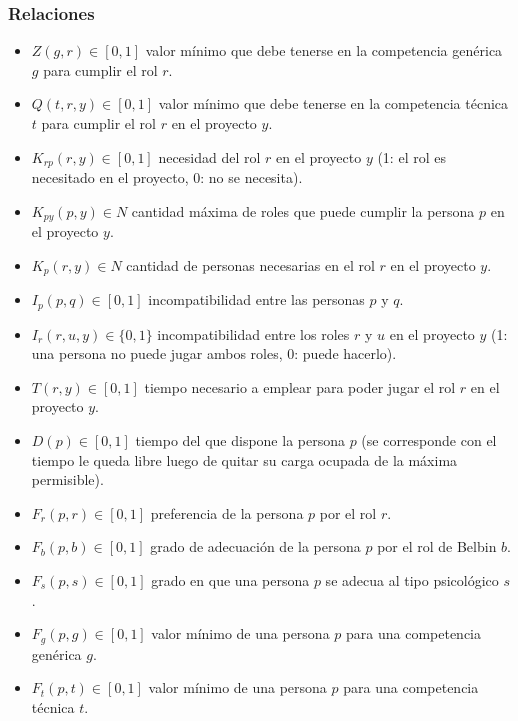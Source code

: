 \subsubsection{Relaciones} \label{relaciones}

\begin{itemize}
  \item $Z(g,r) \in [0,1]$ valor mínimo que debe tenerse en la competencia genérica $g$ para cumplir el rol $r$.
  
  \item $Q(t,r,y) \in [0,1]$ valor mínimo que debe tenerse en la competencia técnica $t$ para cumplir el rol $r$ en el proyecto $y$.
  
  \item $K_{rp}(r, y) \in [0,1]$ necesidad del rol $r$ en el proyecto $y$ (1: el rol es necesitado en el proyecto, 0: no se necesita).
  
  \item $K_{py}(p,y) \in N$ cantidad máxima de roles que puede cumplir la persona $p$ en el proyecto $y$.
  
  \item $K_{p}(r, y) \in N$ cantidad de personas necesarias en el rol $r$ en el proyecto $y$.
  \item $I_p(p,q) \in [0,1]$ incompatibilidad entre las personas $p$ y $q$.
  
  \item $I_r(r,u,y) \in \{0,1\}$ incompatibilidad entre los roles $r$ y $u$ en el proyecto $y$ (1: una persona no puede jugar ambos roles, 0: puede hacerlo).
  
  \item $T(r,y) \in [0,1]$ tiempo necesario a emplear para poder jugar el rol $r$ en el proyecto $y$.
  
  \item $D(p) \in [0,1]$ tiempo del que dispone la persona $p$ (se corresponde con el tiempo le queda libre luego de quitar su carga ocupada de la máxima permisible).

  
  \item $F_r(p,r) \in [0,1]$ preferencia de la persona $p$ por el rol $r$.
  
  \item $F_b(p,b) \in [0,1]$ grado de adecuación de la persona $p$ por el rol de Belbin $b$.
  
  \item $F_s(p,s) \in [0,1]$ grado en que una persona $p$ se adecua al tipo psicológico $s$.
  
  \item $F_g(p,g) \in [0,1]$ valor mínimo de una persona $p$ para una competencia genérica $g$.
  
  \item $F_t(p,t) \in [0,1]$ valor mínimo de una persona $p$ para una competencia técnica $t$.
\end{itemize}

